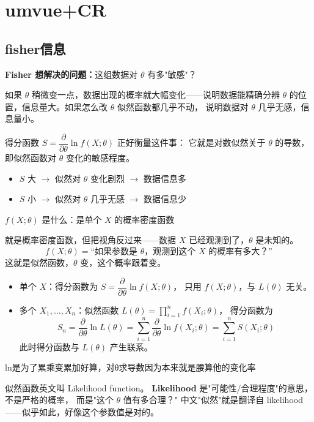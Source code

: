 \section{umvue+CR}
\subsection{fisher信息}
\begin{note}
\textbf{Fisher 想解决的问题：}这组数据对 $\theta$ 有多"敏感"？

如果 $\theta$ 稍微变一点，数据出现的概率就大幅变化——说明数据能精确分辨
$\theta$ 的位置，信息量大。如果怎么改 $\theta$ 似然函数都几乎不动，
说明数据对 $\theta$ 几乎无感，信息量小。
\end{note}

\begin{note}
得分函数 $S = \dfrac{\partial}{\partial\theta}\ln f(X;\theta)$ 正好衡量这件事：
它就是对数似然关于 $\theta$ 的导数，即似然函数对 $\theta$ 变化的敏感程度。
\begin{itemize}
  \item $S$ 大 $\to$ 似然对 $\theta$ 变化剧烈 $\to$ 数据信息多
  \item $S$ 小 $\to$ 似然对 $\theta$ 几乎无感 $\to$ 数据信息少
\end{itemize}
\end{note}
\begin{note}
$f(X;\theta)$ 是什么：是单个 $X$ 的概率密度函数

就是概率密度函数，但把视角反过来——数据 $X$ 已经观测到了，$\theta$ 是未知的。
$$f(X;\theta) = \text{``如果参数是 } \theta \text{，观测到这个 } X \text{ 的概率有多大？''}$$
这就是似然函数，$\theta$ 变，这个概率跟着变。
\begin{itemize}
  \item 单个 $X$：得分函数为 $S = \dfrac{\partial}{\partial\theta}\ln f(X;\theta)$，
        只用 $f(X;\theta)$，与 $L(\theta)$ 无关。
  \item 多个 $X_1,\dots,X_n$：似然函数 $L(\theta)=\prod_{i=1}^n f(X_i;\theta)$，
        得分函数为
        $$S_n = \frac{\partial}{\partial\theta}\ln L(\theta)
        = \sum_{i=1}^n \frac{\partial}{\partial\theta}\ln f(X_i;\theta)
        = \sum_{i=1}^n S(X_i;\theta)$$
        此时得分函数与 $L(\theta)$ 产生联系。
\end{itemize}
\end{note}
\begin{dxtips}
    ln是为了累乘变累加好算，对θ求导数因为本来就是腰算他的变化率
\end{dxtips}
\begin{note}
    似然函数英文叫 Likelihood function。
\textbf{Likelihood} 是"可能性/合理程度"的意思，不是严格的概率，
而是"这个 $\theta$ 值有多合理？"
中文"似然"就是翻译自 likelihood——似乎如此，好像这个参数值是对的。
\end{note}
